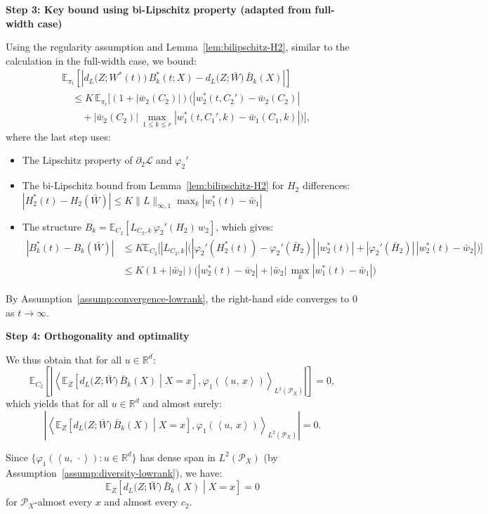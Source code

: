 \documentclass[11pt]{article}
\newcommand{\E}{\mathbb{E}}
\newcommand{\R}{\mathbb{R}}
\newcommand{\1}{\mathbbm{1}}
\newcommand{\ip}[2]{\left\langle #1,\,#2 \right\rangle}
\begin{document}
\textbf{Step 3: Key bound using bi-Lipschitz property (adapted from full-width case)}

Using the regularity assumption and Lemma~\ref{lem:bilipschitz-H2}, similar to the calculation in the full-width case, we bound:
\begin{align*}
&\E_{\pi_t}\left[\left|d_L\big(Z;W^*(t)\big)\,B_k^*(t;X)-d_L\big(Z;\bar{W}\big)\,\bar{B}_k(X)\right|\right]\\
&\quad \le K\,\E_{\pi_t}\Big[(1+|\bar{w}_2(C_2)|)\Big(|w_2^*(t,C_2')-\bar{w}_2(C_2)|\\
&\qquad + |\bar{w}_2(C_2)|\,\max_{1\le k\le r}|w_1^*(t,C_1',k)-\bar{w}_1(C_1,k)|\Big)\Big],
\end{align*}
where the last step uses:
\begin{itemize}
\item The Lipschitz property of $\partial_2\mathcal{L}$ and $\varphi_2'$
\item The bi-Lipschitz bound from Lemma~\ref{lem:bilipschitz-H2} for $H_2$ differences: $|H_2^*(t)-H_2(\bar{W})|\le K\|L\|_{\infty,1}\max_k|w_1^*(t)-\bar{w}_1|$
\item The structure $B_k = \E_{C_2}[L_{C_2,k}\,\varphi_2'(H_2)\,w_2]$, which gives:
\begin{align*}
|B_k^*(t)-B_k(\bar{W})| &\le K\E_{C_2}\big[|L_{C_2,k}|\big(|\varphi_2'(H_2^*(t))-\varphi_2'(\bar{H}_2)|\,|w_2^*(t)| + |\varphi_2'(\bar{H}_2)|\,|w_2^*(t)-\bar{w}_2|\big)\big]\\
&\le K(1+|\bar{w}_2|)\Big(|w_2^*(t)-\bar{w}_2| + |\bar{w}_2|\,\max_k|w_1^*(t)-\bar{w}_1|\Big)
\end{align*}
\end{itemize}

By Assumption~\ref{assump:convergence-lowrank}, the right-hand side converges to $0$ as $t\to\infty$.

\textbf{Step 4: Orthogonality and optimality}

We thus obtain that for all $u\in\R^d$:
\[
\E_{C_2}\left[\left|\left\langle \E_{Z}\!\left[d_L\big(Z;\bar{W}\big)\,\bar{B}_k(X)\middle|X=x\right],\varphi_1(\ip{u}{x})\right\rangle_{L^2(\mathcal{P}_X)}\right|\right] = 0,
\]
which yields that for all $u\in\R^d$ and almost surely:
\[
\left|\left\langle \E_{Z}\!\left[d_L\big(Z;\bar{W}\big)\,\bar{B}_k(X)\middle|X=x\right],\varphi_1(\ip{u}{x})\right\rangle_{L^2(\mathcal{P}_X)}\right| = 0.
\]

Since $\{\varphi_1(\ip{u}{\cdot}): u\in\R^d\}$ has dense span in $L^2(\mathcal{P}_X)$ (by Assumption~\ref{assump:diversity-lowrank}), we have:
\[
\E_{Z}\!\left[d_L\big(Z;\bar{W}\big)\,\bar{B}_k(X)\middle|X=x\right] = 0
\]
for $\mathcal{P}_X$-almost every $x$ and almost every $c_2$.
\end{document}
